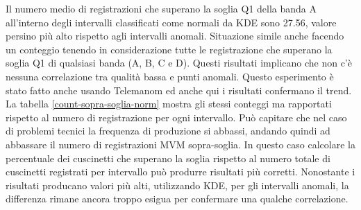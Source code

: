 Il numero medio di registrazioni che superano la soglia Q1 della banda A all'interno degli intervalli classificati come normali da KDE sono 27.56, valore persino più alto rispetto agli intervalli anomali. Situazione simile anche facendo un conteggio tenendo in considerazione tutte le registrazione che superano la soglia Q1 di qualsiasi banda (A, B, C e D). Questi risultati implicano che non c'è nessuna correlazione tra qualità bassa e punti anomali. 
Questo esperimento è stato fatto anche usando Telemanom ed anche qui i risultati confermano il trend.
La tabella \ref{count-sopra-soglia-norm} mostra gli stessi conteggi ma rapportati rispetto al numero di registrazione per ogni intervallo. Può capitare che nel caso di problemi tecnici la frequenza di produzione si abbassi, andando quindi ad abbassare il numero di registrazioni MVM sopra-soglia. In questo caso calcolare la percentuale dei cuscinetti che superano la soglia rispetto al numero totale di cuscinetti registrati per intervallo può produrre risultati più corretti. 
Nonostante i risultati producano valori più alti, utilizzando KDE, per gli intervalli anomali, la differenza rimane ancora troppo esigua per confermare una qualche correlazione. 

\begin{table}[ht]
\centering
{}
\caption{\label{count-sopra-soglia}Numero medio di cuscinetti sopra-soglia per intervallo}
\end{table}

